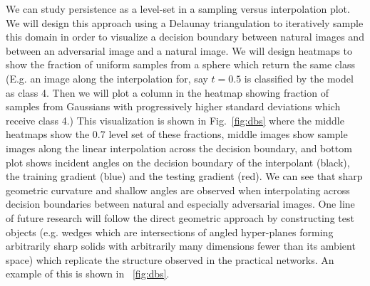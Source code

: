 We can study persistence as a level-set in a sampling versus interpolation plot. We will design this approach using a Delaunay triangulation to iteratively sample this domain in order to visualize a decision boundary between natural images and between an adversarial image and a natural image. We will design heatmaps to show the fraction of uniform samples from a sphere which return the same class (E.g. an image along the interpolation for, say $t = 0.5$ is classified by the model as class 4. Then we will plot a column in the heatmap showing fraction of samples from Gaussians with progressively higher standard deviations which receive class 4.) This visualization is shown in Fig.~\ref{fig:dbs} where the middle  heatmaps show the 0.7 level set of these fractions, middle images show sample images along the linear interpolation across the decision boundary, and bottom plot shows incident angles on the decision boundary of the interpolant (black), the training gradient (blue) and the testing gradient (red). We can see that sharp geometric curvature and shallow angles are observed when interpolating across decision boundaries between natural and especially adversarial images. One line of future research will follow the direct geometric approach by constructing test objects (e.g. wedges which are intersections of angled hyper-planes forming arbitrarily sharp solids with arbitrarily many dimensions fewer than its ambient space) which replicate the structure observed in the practical networks. An example of this is shown in ~\ref{fig:dbs}.

